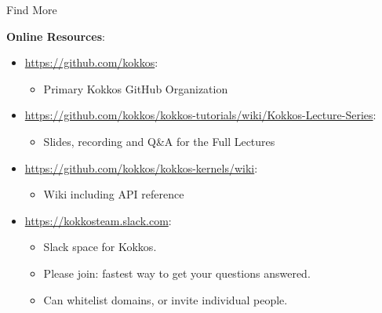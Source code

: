 \begin{frame}{Find More}

  \textbf{Online Resources}:

  \begin{itemize}
    \item \url{https://github.com/kokkos}:
          \begin{itemize}
            \item Primary Kokkos GitHub Organization
          \end{itemize}
    \item \url{https://github.com/kokkos/kokkos-tutorials/wiki/Kokkos-Lecture-Series}:
          \begin{itemize}
            \item{Slides, recording and Q\&A for the Full Lectures}
          \end{itemize}
    \item \url{https://github.com/kokkos/kokkos-kernels/wiki}:
          \begin{itemize}
            \item Wiki including API reference
          \end{itemize}
    \item \url{https://kokkosteam.slack.com}:
          \begin{itemize}
            \item Slack space for Kokkos.
            \item Please join: fastest way to get your questions answered.
            \item Can whitelist domains, or invite individual people.
          \end{itemize}
  \end{itemize}

\end{frame}






